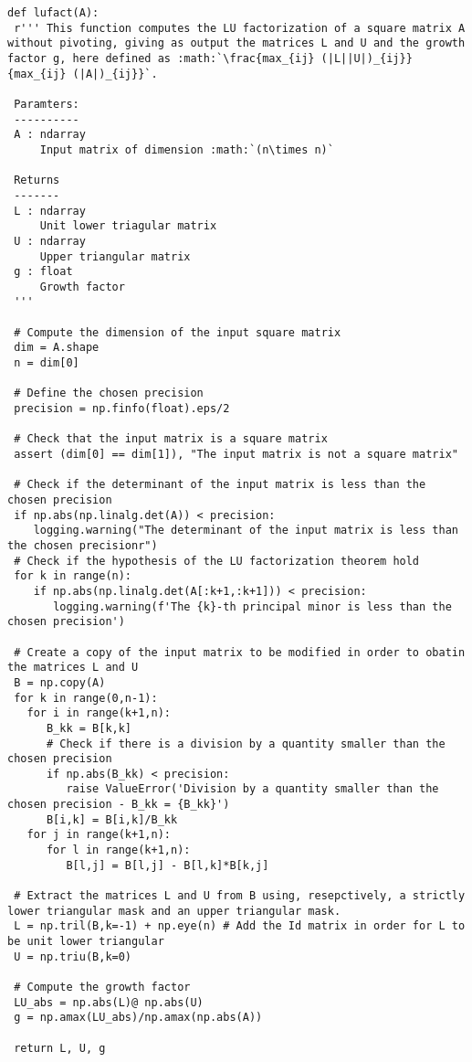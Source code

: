 \documentclass[a4paper,11pt]{article}
\begin{document}
\begin{verbatim}
def lufact(A):
 r''' This function computes the LU factorization of a square matrix A without pivoting, giving as output the matrices L and U and the growth factor g, here defined as :math:`\frac{max_{ij} (|L||U|)_{ij}}{max_{ij} (|A|)_{ij}}`.

 Paramters:
 ----------
 A : ndarray
     Input matrix of dimension :math:`(n\times n)`
	
 Returns
 -------
 L : ndarray
     Unit lower triagular matrix
 U : ndarray
     Upper triangular matrix
 g : float
     Growth factor
 '''

 # Compute the dimension of the input square matrix
 dim = A.shape
 n = dim[0]

 # Define the chosen precision
 precision = np.finfo(float).eps/2

 # Check that the input matrix is a square matrix
 assert (dim[0] == dim[1]), "The input matrix is not a square matrix"

 # Check if the determinant of the input matrix is less than the chosen precision
 if np.abs(np.linalg.det(A)) < precision:
    logging.warning("The determinant of the input matrix is less than the chosen precisionr")
 # Check if the hypothesis of the LU factorization theorem hold
 for k in range(n):
    if np.abs(np.linalg.det(A[:k+1,:k+1])) < precision:
       logging.warning(f'The {k}-th principal minor is less than the chosen precision')

 # Create a copy of the input matrix to be modified in order to obatin the matrices L and U
 B = np.copy(A)
 for k in range(0,n-1):
   for i in range(k+1,n):
      B_kk = B[k,k]
      # Check if there is a division by a quantity smaller than the chosen precision
      if np.abs(B_kk) < precision:
         raise ValueError('Division by a quantity smaller than the chosen precision - B_kk = {B_kk}')
      B[i,k] = B[i,k]/B_kk
   for j in range(k+1,n):
      for l in range(k+1,n):
         B[l,j] = B[l,j] - B[l,k]*B[k,j]

 # Extract the matrices L and U from B using, resepctively, a strictly lower triangular mask and an upper triangular mask.
 L = np.tril(B,k=-1) + np.eye(n) # Add the Id matrix in order for L to be unit lower triangular
 U = np.triu(B,k=0)  

 # Compute the growth factor
 LU_abs = np.abs(L)@ np.abs(U)
 g = np.amax(LU_abs)/np.amax(np.abs(A))

 return L, U, g
\end{verbatim}
\end{document}
